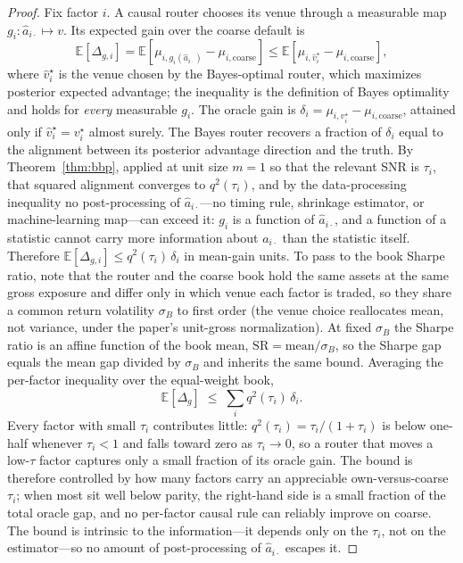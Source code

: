 \documentclass[12pt]{article}
\theoremstyle{plain}
\theoremstyle{definition}
\newcommand{\E}{\mathbb{E}}
\begin{document}
\begin{proof}
Fix factor $i$. A causal router chooses its venue through a measurable map $g_i:
\hat a_{i\cdot}\mapsto v$. Its expected gain over the coarse default is
\[
\E[\Delta_{g,i}]=\E\!\left[\mu_{i,g_i(\hat a_{i\cdot})}-\mu_{i,\text{coarse}}
\right]\le\E\!\left[\mu_{i,\hat v^\star_i}-\mu_{i,\text{coarse}}\right],
\]
where $\hat v^\star_i$ is the venue chosen by the Bayes-optimal router, which
maximizes posterior expected advantage; the inequality is the definition of
Bayes optimality and holds for \emph{every} measurable $g_i$. The oracle gain is
$\delta_i=\mu_{i,v^\star_i}-\mu_{i,\text{coarse}}$, attained only if $\hat
v^\star_i=v^\star_i$ almost surely. The Bayes router recovers a fraction of
$\delta_i$ equal to the alignment between its posterior advantage direction and
the truth. By Theorem~\ref{thm:bbp}, applied at unit size $m=1$ so that the
relevant SNR is $\tau_i$, that squared alignment converges to $q^2(\tau_i)$, and
by the data-processing inequality no post-processing of $\hat a_{i\cdot}$---no
timing rule, shrinkage estimator, or machine-learning map---can exceed it:
$g_i$ is a function of $\hat a_{i\cdot}$, and a function of a statistic cannot
carry more information about $a_{i\cdot}$ than the statistic itself. Therefore
$\E[\Delta_{g,i}]\le q^2(\tau_i)\,\delta_i$ in mean-gain units. To pass to the
book Sharpe ratio, note that the router and the coarse book hold the same assets
at the same gross exposure and differ only in which venue each factor is traded,
so they share a common return volatility $\sigma_B$ to first order (the venue
choice reallocates mean, not variance, under the paper's unit-gross
normalization). At fixed $\sigma_B$ the Sharpe ratio is an affine function of the
book mean, $\mathrm{SR}=\mathrm{mean}/\sigma_B$, so the Sharpe gap equals the
mean gap divided by $\sigma_B$ and inherits the same bound. Averaging the
per-factor inequality over the equal-weight book,
\[
\E[\Delta_g]\;\le\;\sum_i q^2(\tau_i)\,\delta_i.
\]
Every factor with small $\tau_i$ contributes little: $q^2(\tau_i)=\tau_i/(1+
\tau_i)$ is below one-half whenever $\tau_i<1$ and falls toward zero as
$\tau_i\to0$, so a router that moves a low-$\tau$ factor captures only a small
fraction of its oracle gain. The bound is therefore controlled by how many
factors carry an appreciable own-versus-coarse $\tau_i$; when most sit well below
parity, the right-hand side is a small fraction of the total oracle gap, and no
per-factor causal rule can reliably improve on coarse. The bound is intrinsic to
the information---it depends only on the $\tau_i$, not on the estimator---so no
amount of post-processing of $\hat a_{i\cdot}$ escapes it. \qedhere
\end{proof}
\end{document}
